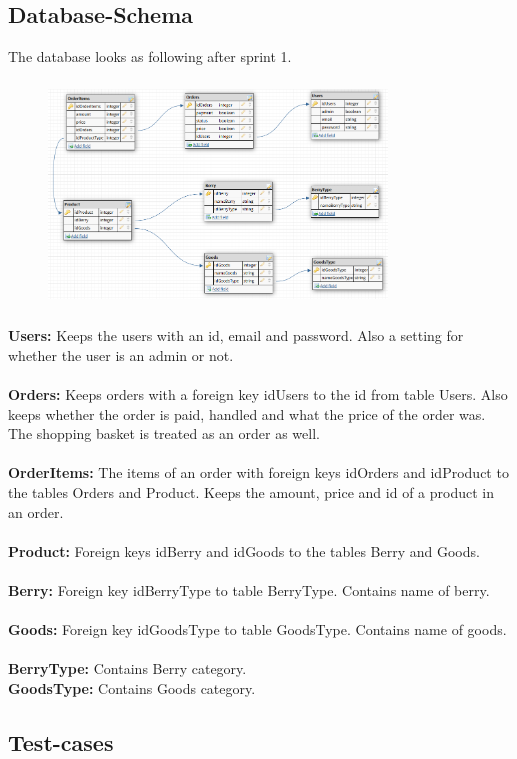 \subsection{Database-Schema}
The database looks as following after sprint 1.
\begin{figure}[H]
    \center
    \includegraphics[height=6cm, width=9cm]{new_db_schema.PNG}
\end{figure} 

\textbf{Users:}
Keeps the users with an id, email and password. Also a setting for whether the user is an admin or
not. 
\\
\\
\textbf{Orders:}
Keeps orders with a foreign key idUsers to the id from table Users. Also keeps whether the order is
paid, handled and what the price of the order was. The shopping basket is treated as an order as
well.
\\
\\
\textbf{OrderItems:}
The items of an order with foreign keys idOrders and idProduct to the tables Orders and Product.
Keeps the amount, price and id of a product in an order.
\\
\\
\textbf{Product:}
Foreign keys idBerry and idGoods to the tables Berry and Goods.
\\
\\
\textbf{Berry:}
Foreign key idBerryType to table BerryType. Contains name of berry.
\\
\\
\textbf{Goods:}
Foreign key idGoodsType to table GoodsType. Contains name of goods.
\\
\\
\textbf{BerryType:}
Contains Berry category.
\\
\textbf{GoodsType:}
Contains Goods category.
\newpage
\subsection{Test-cases}


